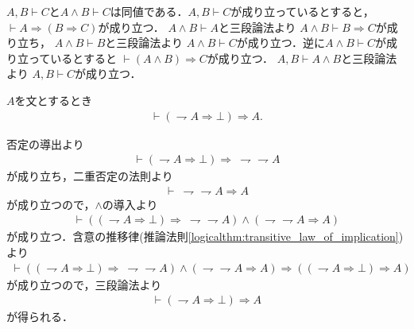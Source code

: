 	$A,B \vdash C$と$A \wedge B \vdash C$は同値である．$A,B \vdash C$が成り立っているとすると，
	$\vdash A \Longrightarrow (B \Longrightarrow C)$が成り立つ．
	$A \wedge B \vdash A$と三段論法より
	$A \wedge B \vdash B \Longrightarrow C$が成り立ち，
	$A \wedge B \vdash B$と三段論法より
	$A \wedge B \vdash C$が成り立つ．逆に$A \wedge B \vdash C$が成り立っているとすると
	$\vdash (A \wedge B) \Longrightarrow C$が成り立つ．
	$A,B \vdash A \wedge B$と三段論法より
	$A, B \vdash C$が成り立つ．
	
	\begin{screen}
		\begin{logicalthm}[背理法の原理]
			$A$を文とするとき
			\begin{align}
				\vdash (\rightharpoondown A \Longrightarrow \bot) \Longrightarrow A.
			\end{align}
		\end{logicalthm}
	\end{screen}
	
	\begin{prf}
		否定の導出より
		\begin{align}
			\vdash (\rightharpoondown A \Longrightarrow \bot) \Longrightarrow\ \rightharpoondown \rightharpoondown A
		\end{align}
		が成り立ち，二重否定の法則より
		\begin{align}
			\vdash\ \rightharpoondown \rightharpoondown A \Longrightarrow A
		\end{align}
		が成り立つので，$\wedge$の導入より
		\begin{align}
			\vdash ((\rightharpoondown A \Longrightarrow \bot) \Longrightarrow\ \rightharpoondown \rightharpoondown A)
			\wedge (\rightharpoondown \rightharpoondown A \Longrightarrow A)
		\end{align}
		が成り立つ．含意の推移律(推論法則\ref{logicalthm:transitive_law_of_implication})より
		\begin{align}
			\vdash ((\rightharpoondown A \Longrightarrow \bot) \Longrightarrow\ \rightharpoondown \rightharpoondown A)
			\wedge (\rightharpoondown \rightharpoondown A \Longrightarrow A)
			\Longrightarrow ((\rightharpoondown A \Longrightarrow \bot) \Longrightarrow A)
		\end{align}
		が成り立つので，三段論法より
		\begin{align}
			\vdash (\rightharpoondown A \Longrightarrow \bot) \Longrightarrow A
		\end{align}
		が得られる．
		\QED
	\end{prf}
	
